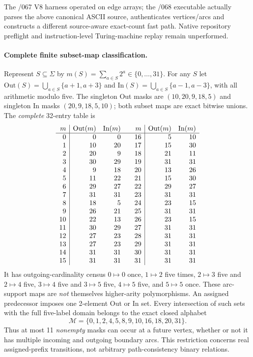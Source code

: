 \documentclass[11pt]{article}
\begin{document}
The /067 V8 harness operated on edge arrays; the /068
executable actually parses the above canonical ASCII
source, authenticates vertices/arcs and constructs
a different source-aware exact-count fast path. Native
repository preflight and instruction-level Turing-machine
replay remain unperformed.

\paragraph{Complete finite subset-map classification.}
Represent $S\subseteq\Sigma$ by
$m(S)=\sum_{a\in S}2^a\in\{0,\ldots,31\}$.
For any $S$ let
$\mathrm{Out}(S)=\bigcup_{a\in S}\{a+1,a+3\}$
and
$\mathrm{In}(S)=\bigcup_{a\in S}\{a-1,a-3\}$,
with all arithmetic modulo five. The singleton Out masks
are $(10,20,9,18,5)$ and singleton In masks
$(20,9,18,5,10)$; both subset maps are exact
bitwise unions. The \emph{complete} 32-entry table is
\[
\begin{array}{r|rr@{\qquad}r|rr}
m & \mathrm{Out}(m)&\mathrm{In}(m) &
m&\mathrm{Out}(m)&\mathrm{In}(m)\\ \hline
0 & 0 & 0 & 16 & 5 & 10 \\
1 & 10 & 20 & 17 & 15 & 30 \\
2 & 20 & 9 & 18 & 21 & 11 \\
3 & 30 & 29 & 19 & 31 & 31 \\
4 & 9 & 18 & 20 & 13 & 26 \\
5 & 11 & 22 & 21 & 15 & 30 \\
6 & 29 & 27 & 22 & 29 & 27 \\
7 & 31 & 31 & 23 & 31 & 31 \\
8 & 18 & 5 & 24 & 23 & 15 \\
9 & 26 & 21 & 25 & 31 & 31 \\
10 & 22 & 13 & 26 & 23 & 15 \\
11 & 30 & 29 & 27 & 31 & 31 \\
12 & 27 & 23 & 28 & 31 & 31 \\
13 & 27 & 23 & 29 & 31 & 31 \\
14 & 31 & 31 & 30 & 31 & 31 \\
15 & 31 & 31 & 31 & 31 & 31 \\
\end{array}
\]
It has outgoing-cardinality census
$0\mapsto0$ once, $1\mapsto2$ five times,
$2\mapsto3$ five and $2\mapsto4$ five,
$3\mapsto4$ five and $3\mapsto5$ five,
$4\mapsto5$ five, and $5\mapsto5$ once.
These arc-support maps are \emph{not} themselves
higher-arity polymorphisms.
An assigned predecessor imposes one 2-element Out or
In set.  Every intersection of such sets with the full
five-label domain belongs to the exact closed alphabet
\[
\mathcal M=\{0,1,2,4,5,8,9,10,16,18,20,31\}.
\]
Thus at most 11 \emph{nonempty} masks can occur at a
future vertex, whether or not it has multiple incoming
and outgoing boundary arcs.  This restriction concerns
real assigned-prefix transitions, not arbitrary path-consistency
binary relations.
\end{document}
